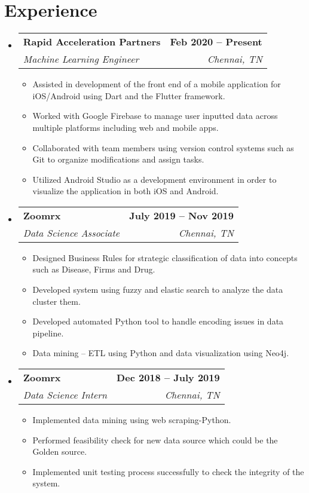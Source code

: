 \documentclass[letterpaper,11pt]{article}
\makeatletter
\newcommand{\resumeItem}[1]{
  \item\small{
    {#1 \vspace{-2pt}}
  }
}
\newcommand{\resumeSubheading}[4]{
  \vspace{-2pt}\item
    \begin{tabular*}{1.0\textwidth}[t]{l@{\extracolsep{\fill}}r}
      \textbf{#1} & \textbf{\small #2} \\
      \textit{\small#3} & \textit{\small #4} \\
    \end{tabular*}\vspace{-7pt}
}
\newcommand{\resumeSubHeadingListStart}{\begin{itemize}[leftmargin=0.0in, label={}]}
\newcommand{\resumeSubHeadingListEnd}{\end{itemize}}
\newcommand{\resumeItemListStart}{\begin{itemize}}
\newcommand{\resumeItemListEnd}{\end{itemize}\vspace{-5pt}}
\makeatother
\begin{document}
\section{Experience}
  \resumeSubHeadingListStart
      
    \resumeSubheading
      {Rapid Acceleration Partners}{Feb 2020 -- Present}
      {Machine Learning Engineer}{Chennai, TN}
      \resumeItemListStart
        \resumeItem{Assisted in development of the front end of a mobile application for iOS/Android using Dart and the Flutter framework.}
        \resumeItem{Worked with Google Firebase to manage user inputted data across multiple platforms including web and mobile apps.}
        \resumeItem{Collaborated with team members using version control systems such as Git to organize modifications and assign tasks.}
        \resumeItem{Utilized Android Studio as a development environment in order to visualize the application in both iOS and Android.}
    \resumeItemListEnd

    \resumeSubheading
      {Zoomrx}{July 2019 -- Nov 2019}
      {Data Science Associate}{Chennai, TN}
      \resumeItemListStart
        \resumeItem{Designed Business Rules for strategic classification of data into concepts such as Disease, Firms and Drug.}
        \resumeItem{Developed system using fuzzy and elastic search to analyze the data cluster them.}
        \resumeItem{Developed automated Python tool to handle encoding issues in data pipeline.}
        \resumeItem{Data mining – ETL using Python and data visualization using Neo4j.}
      \resumeItemListEnd

    \resumeSubheading
      {Zoomrx}{Dec 2018 -- July 2019}
      {Data Science Intern}{Chennai, TN}
      \resumeItemListStart
        \resumeItem{Implemented data mining using web scraping-Python.}
        \resumeItem{Performed feasibility check for new data source which could be the Golden source.}
        \resumeItem{Implemented unit testing process successfully to check the integrity of the system.}
      \resumeItemListEnd
    
  \resumeSubHeadingListEnd
\vspace{-16pt}

\end{document}
